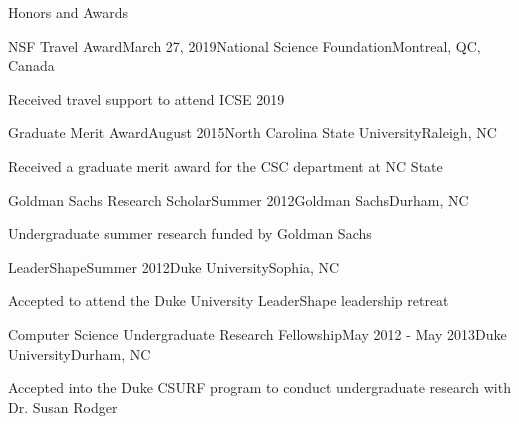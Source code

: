 \documentclass{resume} %
\begin{document}
\begin{rSection}{Honors and Awards}

\begin{rSubsection}
{NSF Travel Award}{March 27, 2019}{National Science Foundation}{Montreal, QC, Canada}
\item Received travel support to attend ICSE 2019
\end{rSubsection}

\begin{rSubsection}
{Graduate Merit Award}{August 2015}{North Carolina State University}{Raleigh, NC}
\item Received a graduate merit award for the CSC department at NC State
\end{rSubsection}

\begin{rSubsection}
{Goldman Sachs Research Scholar}{Summer 2012}{Goldman Sachs}{Durham, NC}
\item Undergraduate summer research funded by Goldman Sachs
\end{rSubsection}

\begin{rSubsection}
{LeaderShape}{Summer 2012}{Duke University}{Sophia, NC}
\item Accepted to attend the Duke University LeaderShape leadership retreat
\end{rSubsection}

\begin{rSubsection}
{Computer Science Undergraduate Research Fellowship}{May 2012 - May 2013}{Duke University}{Durham, NC}
\item Accepted into the Duke CSURF program to conduct undergraduate research with Dr. Susan Rodger
\end{rSubsection}

\end{rSection}
\end{document}
